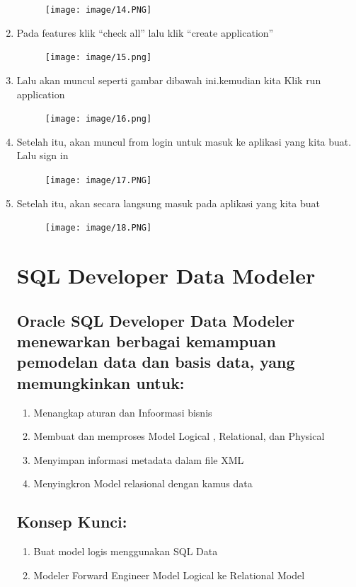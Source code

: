 \documentclass{article}
\begin{document}
\begin{enumerate}
\begin{figure}[h]
            \centerline{\texttt{[image: image/14.PNG]}}
            \end{figure}
    \newpage \item Pada features klik “check all” lalu klik “create application”
    \begin{figure}[h]
            \centerline{\texttt{[image: image/15.png]}}
            \end{figure}
    \item Lalu akan muncul seperti gambar dibawah ini.kemudian kita Klik run application
    \begin{figure}[h]
            \centerline{\texttt{[image: image/16.png]}}
            \end{figure}
    \item Setelah itu, akan muncul from login untuk masuk ke aplikasi yang kita buat. Lalu sign in 
    \begin{figure}[h]
            \centerline{\texttt{[image: image/17.PNG]}}
            \end{figure}
   \newpage \item Setelah itu, akan secara langsung masuk pada aplikasi yang kita buat
   \begin{figure}[h]
            \centerline{\texttt{[image: image/18.PNG]}}
            \end{figure}
\newpage \section{SQL Developer Data Modeler }
\subsection{Oracle SQL Developer Data Modeler menewarkan berbagai kemampuan pemodelan data dan basis data, yang memungkinkan untuk:}
\begin{enumerate}
    \item Menangkap  aturan dan Infoormasi bisnis
    \item Membuat dan memproses Model Logical , Relational, dan Physical
    \item Menyimpan informasi metadata dalam file XML
    \item Menyingkron Model relasional dengan kamus data
\end{enumerate}
\subsection{Konsep Kunci:}
\begin{enumerate}
    \item Buat model logis menggunakan SQL Data 
    \item Modeler Forward Engineer Model Logical ke Relational Model
\end{enumerate}

\end{enumerate}
\end{document}
